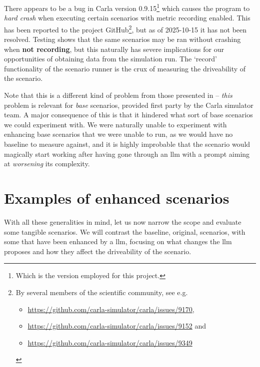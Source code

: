
There appears to be a bug in Carla version 0.9.15\footnote{Which is the version
    employed for this project.} which causes the program to \emph{hard crash} when
executing certain scenarios with metric recording enabled. This has been
reported to the project GitHub\footnote{By several members of the scientific community, see e.g.
    \begin{itemize}\item  \url{https://github.com/carla-simulator/carla/issues/9170}, \item
              \url{https://github.com/carla-simulator/carla/issues/9152} and \item
              \url{https://github.com/carla-simulator/carla/issues/9349}\end{itemize}}, but as of 2025-10-15
it has not been resolved. Testing shows that the same scenarios may be ran without crashing when
\textbf{not recording}, but this naturally has severe implications for our
opportunities of obtaining data from the simulation run. The `record' functionality
of the scenario runner is the crux of measuring the driveability of the
scenario.

Note that this is a different kind of problem from those presented in
 -- \emph{this} problem is relevant for \emph{base} scenarios,
provided first party by the Carla simulator team. A major consequence of this is that it hindered
what sort of base scenarios we could experiment with. We were naturally unable to experiment with
enhancing base scenarios that we were unable to run, as we would have no baseline to measure
against, and it is highly improbable that the scenario would magically start working after having
gone through an \acrshort{llm} with a prompt aiming at \emph{worsening} its complexity.

\section{Examples of enhanced scenarios}\label{sec:examplesOfEnhancedScenarios}

With all these generalities in mind, let us now narrow the scope and evaluate some tangible scenarios. We will contrast the baseline, original, scenarios, with
some that have been enhanced by a \acrshort{llm}, focusing on what changes the \acrshort{llm}
proposes and how they affect the driveability of the scenario.

